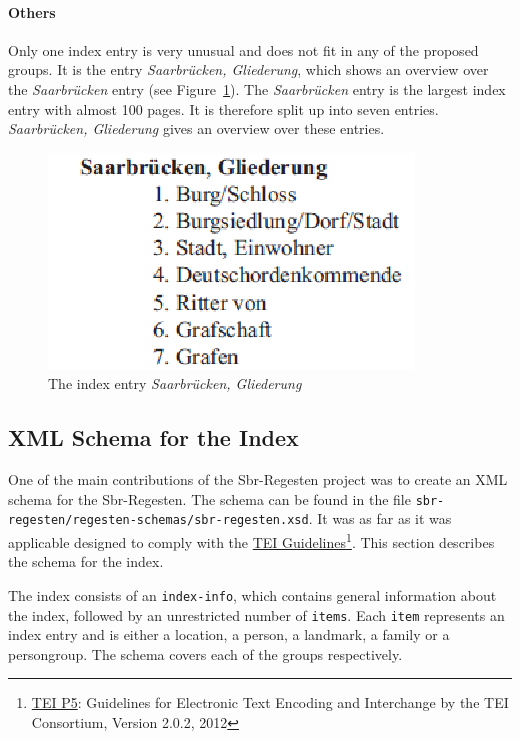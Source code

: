 \paragraph{Others}
\label{sec:other-index-entry}
Only one index entry is very unusual and does not fit in any of the
proposed groups. It is the entry \textit{Saarbrücken, Gliederung},
which shows an overview over the \textit{Saarbrücken} entry (see
Figure~\ref{fig:sb-gliederung}). The \textit{Saarbrücken} entry is the
largest index entry with almost 100 pages. It is therefore split up
into seven entries. \textit{Saarbrücken, Gliederung} gives an overview
over these entries.

\begin{figure}[h]
  \centering
  \includegraphics[scale=0.6]{img/sb-gliederung}
  \caption{The index entry \textit{Saarbrücken, Gliederung}}
  \label{fig:sb-gliederung}
\end{figure}


\subsection{XML Schema for the Index}
\label{sec:index-schema}
One of the main contributions of the Sbr-Regesten project was to
create an XML schema for the Sbr-Regesten. The schema can be found in
the file \texttt{sbr-regesten/regesten-schemas/sbr-regesten.xsd}. It
was as far as it was applicable designed to comply with the
\href{http://www.tei-c.org/Guidelines/} {TEI
  Guidelines}\footnote{\href{http://www.tei-c.org/Guidelines/P5/index.xml}{TEI
    P5}: Guidelines for Electronic Text Encoding and Interchange by
  the TEI Consortium, Version 2.0.2, 2012}. This section describes the
schema for the index.

The index consists of an \texttt{index-info}, which contains general
information about the index, followed by an unrestricted number of
\texttt{items}. Each \texttt{item} represents an index entry and is
either a location, a person, a landmark, a family or a persongroup.
The schema covers each of the groups respectively.


